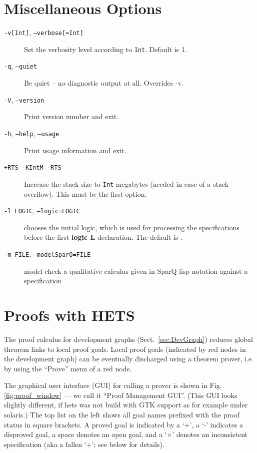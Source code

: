 \documentclass{article}
\newcommand{\normalTEXTSC}[2]{{#1\scriptsize#2}}
\newcommand     {\Hets}{\normalTEXTSC{H}{ETS}\xspace}
\begin{document}
\section{Miscellaneous Options}

\begin{description}
\item[\texttt{-v[Int]}, \texttt{--verbose[=Int]}]
Set the verbosity level according to \texttt{Int}. Default is 1.
\item[\texttt{-q}, \texttt{--quiet}]
Be quiet -- no diagnostic output at all. Overrides -v.
\item[\texttt{-V}, \texttt{--version}] Print version number and exit.
\item[\texttt{-h}, \texttt{--help}, \texttt{--usage}]
Print usage information and exit.
\item[\texttt{+RTS -KIntM -RTS}] Increase the stack size to
 \texttt{Int} megabytes (needed in case of a stack overflow).
This must be the first option.
\item[\texttt{-l LOGIC}, \texttt{--logic=LOGIC}] chooses the initial logic, which is used for processing the specifications before the first \textbf{logic L}
declaration. The default is \CASL.
\item[\texttt{-m FILE}, \texttt{--modelSparQ=FILE}] model check a qualitative calculus given in SparQ lisp notation \cite{SparQ06} against a \CASL specification
\end{description}

\section{Proofs with \Hets}\label{sec:Proofs}

The proof calculus for development graphs (Sect.~\ref{sec:DevGraph}) reduces
global theorem links to local proof goals. Local proof goals (indicated by red
nodes in the development graph) can be eventually discharged using a theorem
prover, i.e. by using the ``Prove'' menu of a red node.

The graphical user interface (GUI) for calling a prover is shown in
Fig. \ref{fig:proof_window} --- we call it ``Proof Management GUI''.
(This GUI looks slightly different, if hets was not build with GTK support as
for example under solaris.)
The top list on the left shows all goal names prefixed with the proof
status in square brackets. A proved goal is indicated by a `+', a `-'
indicates a disproved goal, a space denotes an open goal, and a
`$\times$' denotes an inconsistent specification (aka a fallen `+';
see below for details).
\end{document}
